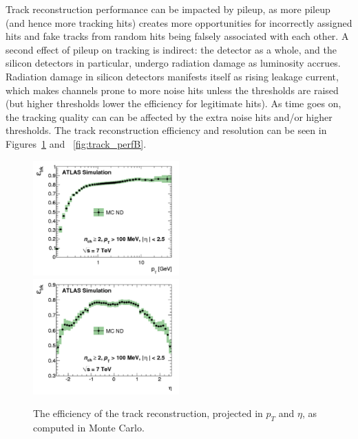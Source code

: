 Track reconstruction performance can be impacted by pileup, as more pileup (and hence more tracking hits) creates 
more opportunities for incorrectly assigned hits and fake tracks from random hits being falsely associated with each other.  A 
second effect of pileup on tracking is indirect: the detector as a whole, and the silicon detectors in 
particular, undergo radiation damage as luminosity accrues.  Radiation damage in silicon detectors manifests 
itself as rising leakage current, which makes channels prone to more noise hits unless the thresholds are raised 
(but higher thresholds lower the efficiency for legitimate hits).  As time goes on, the tracking quality can can 
be affected by the extra noise hits and/or higher thresholds.  The track reconstruction efficiency and resolution
can be seen in Figures~\ref{fig:track_perfA} and ~\ref{fig:track_perfB}.

\begin{figure}
	\includegraphics[width=0.5\textwidth]{ReconstructionPerformance/images/track_perf1.pdf}
	\includegraphics[width=0.5\textwidth]{ReconstructionPerformance/images/track_perf2.pdf}
	\caption{The efficiency of the track reconstruction, projected in $p_T$ and $\eta$, as computed in Monte Carlo.\label{fig:track_perfA}}
\end{figure}



